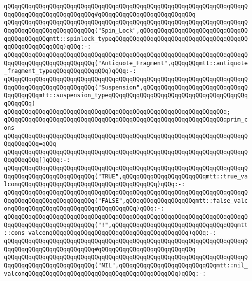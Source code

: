 \verb|qQQqqQQqqQQqqQQqqQQqqQQqqQQqqQQqqQQqqQQqqQQqqQQqqQQqqQQqqQQqqQQqqQQqqQQqqQQqqQQqqQQqqQQqqQQqqQQq#qQQqqQQqqQQqqQQqqQQqqQQqqQQq|\newline
\verb|qQQqqQQqqQQqqQQqqQQqqQQqqQQqqQQqqQQqqQQqqQQqqQQqqQQqqQQqqQQqqQQqqQQqqQQqqQQqqQQqqQQqqQQqqQQqqQQq("Spin_Lock",qQQqqQQqqQQqqQQqqQQqqQQqqQQqqQQqqQQqqQQqqQQqmtt::spinlock_typeqQQqqQQqqQQqqQQqqQQqqQQqqQQqqQQqqQQqqQQqqQQqqQQqqQQqqQQq)qQQq:-:|\newline
\verb|qQQqqQQqqQQqqQQqqQQqqQQqqQQqqQQqqQQqqQQqqQQqqQQqqQQqqQQqqQQqqQQqqQQqqQQqqQQqqQQqqQQqqQQqqQQqqQQq("Antiquote_Fragment",qQQqqQQqmtt::antiquote_fragment_typeqQQqqQQqqQQqqQQq)qQQq:-:|\newline
\verb|qQQqqQQqqQQqqQQqqQQqqQQqqQQqqQQqqQQqqQQqqQQqqQQqqQQqqQQqqQQqqQQqqQQqqQQqqQQqqQQqqQQqqQQqqQQqqQQq("Suspension",qQQqqQQqqQQqqQQqqQQqqQQqqQQqqQQqqQQqqQQqmtt::suspension_typeqQQqqQQqqQQqqQQqqQQqqQQqqQQqqQQqqQQqqQQqqQQqqQQq)|\newline
\verb|qQQqqQQqqQQqqQQqqQQqqQQqqQQqqQQqqQQqqQQqqQQqqQQqqQQqqQQqqQQqqQQq;|\newline
\newline
\verb|qQQqqQQqqQQqqQQqqQQqqQQqqQQqqQQqqQQqqQQqqQQqqQQqqQQqqQQqqQQqqQQqprim_cons|\newline
\verb|qQQqqQQqqQQqqQQqqQQqqQQqqQQqqQQqqQQqqQQqqQQqqQQqqQQqqQQqqQQqqQQqqQQqqQQqqQQqqQQq=qQQq|\newline
\verb|qQQqqQQqqQQqqQQqqQQqqQQqqQQqqQQqqQQqqQQqqQQqqQQqqQQqqQQqqQQqqQQqqQQqqQQqqQQqqQQq[]qQQq:-:|\newline
\verb|qQQqqQQqqQQqqQQqqQQqqQQqqQQqqQQqqQQqqQQqqQQqqQQqqQQqqQQqqQQqqQQqqQQqqQQqqQQqqQQqqQQqqQQqqQQqqQQq("TRUE",qQQqqQQqqQQqqQQqqQQqqQQqmtt::true_valconqQQqqQQqqQQqqQQqqQQqqQQqqQQqqQQqqQQqqQQq)qQQq:-:|\newline
\verb|qQQqqQQqqQQqqQQqqQQqqQQqqQQqqQQqqQQqqQQqqQQqqQQqqQQqqQQqqQQqqQQqqQQqqQQqqQQqqQQqqQQqqQQqqQQqqQQq("FALSE",qQQqqQQqqQQqqQQqqQQqmtt::false_valconqQQqqQQqqQQqqQQqqQQqqQQqqQQqqQQqqQQq)qQQq:-:|\newline
\verb|qQQqqQQqqQQqqQQqqQQqqQQqqQQqqQQqqQQqqQQqqQQqqQQqqQQqqQQqqQQqqQQqqQQqqQQqqQQqqQQqqQQqqQQqqQQqqQQq("!",qQQqqQQqqQQqqQQqqQQqqQQqqQQqqQQqqQQqmtt::cons_valconqQQqqQQqqQQqqQQqqQQqqQQqqQQqqQQqqQQqqQQq)qQQq:-:|\newline
\verb|qQQqqQQqqQQqqQQqqQQqqQQqqQQqqQQqqQQqqQQqqQQqqQQqqQQqqQQqqQQqqQQqqQQqqQQqqQQqqQQqqQQqqQQqqQQqqQQq#qQQqqQQqqQQqqQQqqQQqqQQqqQQq|\newline
\verb|qQQqqQQqqQQqqQQqqQQqqQQqqQQqqQQqqQQqqQQqqQQqqQQqqQQqqQQqqQQqqQQqqQQqqQQqqQQqqQQqqQQqqQQqqQQqqQQq("NIL",qQQqqQQqqQQqqQQqqQQqqQQqqQQqmtt::nil_valconqQQqqQQqqQQqqQQqqQQqqQQqqQQqqQQqqQQqqQQqqQQq)qQQq:-:|\newline
